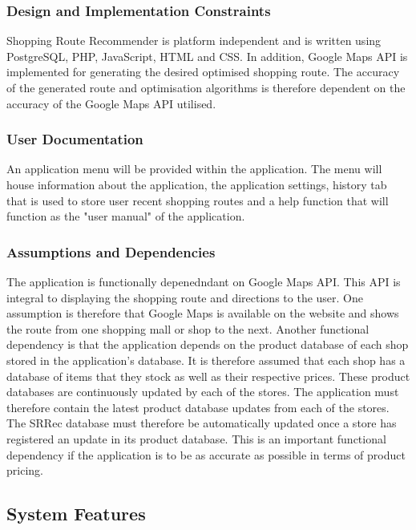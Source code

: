 \documentclass[10pt,twocolumn]{witseiepaper}
\begin{document}
		\subsubsection{Design and Implementation Constraints} 
		
			Shopping Route Recommender is platform independent and is written using PostgreSQL, PHP, JavaScript, HTML and CSS. In addition, Google Maps API is implemented for generating the desired optimised shopping route. The accuracy of the generated route and optimisation algorithms is therefore dependent on the accuracy of the Google Maps API utilised. 
		
		\subsubsection{User Documentation}
		
			An application menu will be provided within the application. The menu will house information about the application, the application settings, history tab that is used to store user recent shopping routes and a help function that will function as the "user manual" of the application. 
		
		\subsubsection{Assumptions and Dependencies}
		
			The application is functionally depenedndant on Google Maps API. This API is integral to displaying the shopping route and directions to the user. One assumption is therefore that Google Maps is available on the website and shows the route from one shopping mall or shop to the next. Another functional dependency is that the application depends on the product database of each shop stored in the application's database. It is therefore assumed that each shop has a database of items that they stock as well as their respective prices. These product databases are continuously updated by each of the stores. The application must therefore contain the latest product database updates from each of the stores. The SRRec database must therefore be automatically updated once a store has registered an update in its product database. This is an important functional dependency if the application is to be as accurate as possible in terms of product pricing. 
		
	\subsection{System Features}
		
\end{document}
